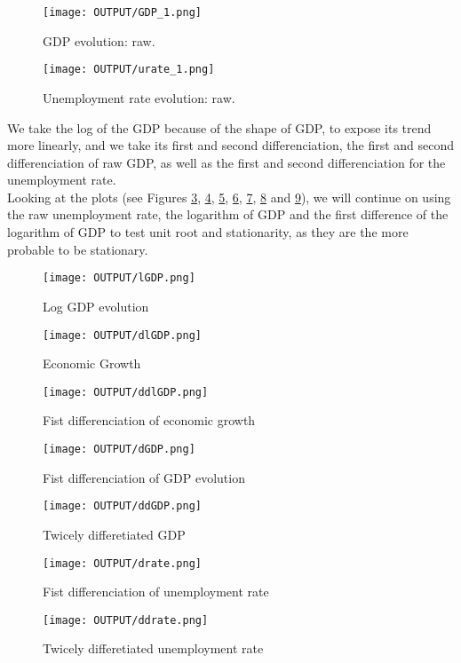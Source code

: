 \documentclass[12pt]{article}
\begin{document}
\begin{figure}[H]
    \centering
    \texttt{[image: OUTPUT/GDP\_1.png]}
    \caption{GDP evolution: raw.}
    \label{fig:GDP_1}
\end{figure}

\begin{figure}[H]
    \centering
    \texttt{[image: OUTPUT/urate\_1.png]}
    \caption{Unemployment rate evolution: raw.}
    \label{fig:urate_1}
\end{figure}

We take the log of the GDP because of the shape of GDP, to expose its trend more linearly,
and we take its first and second differenciation, the first and second differenciation of raw GDP, as well as the first and second 
differenciation for the unemployment rate. \\
Looking at the plots (see Figures \ref*{fig:lGDP}, \ref*{fig:dlGDP}, \ref*{fig:ddlGDP}, \ref*{fig:dGDP}, \ref*{fig:ddGDP}, \ref*{fig:drate} 
and \ref*{fig:ddrate}), we will continue on using the raw unemployment rate, the logarithm of GDP and the first difference of the 
logarithm of GDP to test unit root and stationarity, as they are the more probable to be stationary. 

\begin{figure}[H]
    \centering
    \texttt{[image: OUTPUT/lGDP.png]}
    \caption{Log GDP evolution}
    \label{fig:lGDP}
\end{figure}
\begin{figure}[H]
    \centering
    \texttt{[image: OUTPUT/dlGDP.png]}
    \caption{Economic Growth}
    \label{fig:dlGDP}
\end{figure}
\begin{figure}[H]
    \centering
    \texttt{[image: OUTPUT/ddlGDP.png]}
    \caption{Fist differenciation of economic growth}
    \label{fig:ddlGDP}
\end{figure}
\begin{figure}[H]
    \centering
    \texttt{[image: OUTPUT/dGDP.png]}
    \caption{Fist differenciation of GDP evolution}
    \label{fig:dGDP}
\end{figure}
\begin{figure}[H]
    \centering
    \texttt{[image: OUTPUT/ddGDP.png]}
    \caption{Twicely differetiated GDP}
    \label{fig:ddGDP}
\end{figure}
\begin{figure}[H]
    \centering
    \texttt{[image: OUTPUT/drate.png]}
    \caption{Fist differenciation of unemployment rate}
    \label{fig:drate}
\end{figure}
\begin{figure}[H]
    \centering
    \texttt{[image: OUTPUT/ddrate.png]}
    \caption{Twicely differetiated unemployment rate}
    \label{fig:ddrate}
\end{figure}
\end{document}
